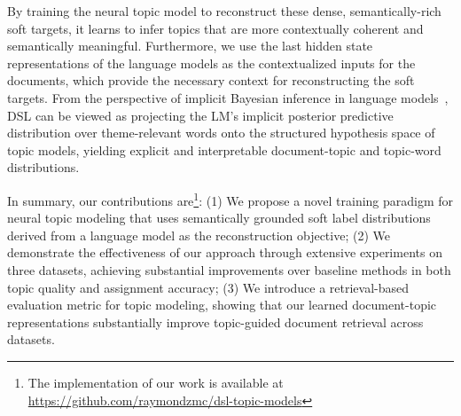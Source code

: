 \documentclass{article}
\theoremstyle{plain}
\theoremstyle{definition}
\theoremstyle{remark}
\begin{document}
By training the neural topic model to reconstruct these dense, semantically-rich soft targets, it learns to infer topics that are more contextually coherent and semantically meaningful. 
Furthermore, we use the last hidden state representations of the language models as the contextualized inputs for the documents, which provide the necessary context for reconstructing the soft targets.
From the perspective of implicit Bayesian inference in language models~\citep{xie2022an, wang2023large, li-etal-2025-explicit}, DSL can be viewed as projecting the LM's implicit posterior predictive distribution over theme-relevant words onto the structured hypothesis space of topic models, yielding explicit and interpretable document-topic and topic-word distributions.


In summary, our contributions are\footnote{The implementation of our work is available at \url{https://github.com/raymondzmc/dsl-topic-models}}:
(1) We propose a novel training paradigm for neural topic modeling that uses semantically grounded soft label distributions derived from a language model as the reconstruction objective;
(2) We demonstrate the effectiveness of our approach through extensive experiments on three datasets, achieving substantial improvements over baseline methods in both topic quality and assignment accuracy;
(3) We introduce a retrieval-based evaluation metric for topic modeling, showing that our learned document-topic representations substantially improve topic-guided document retrieval across datasets.
\end{document}
